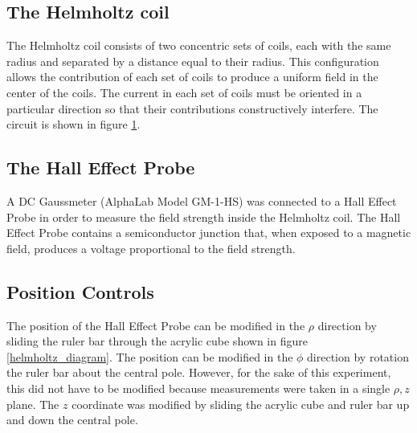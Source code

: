 \documentclass[a4paper]{article}
\begin{document}
\subsection{The Helmholtz coil}
The Helmholtz coil consists of two concentric sets of coils, each with the same radius and separated by a distance equal to their radius. This configuration allows the contribution of each set of coils to produce a uniform field in the center of the coils. The current in each set of coils must be oriented in a particular direction so that their contributions constructively interfere. The circuit is shown in figure \ref{helmholtz_circuit}. 

\begin{figure}[h]
\centering
\label{helmholtz_circuit}
\end{figure}

\subsection{The Hall Effect Probe}
A DC Gaussmeter (AlphaLab Model GM-1-HS) was connected to a Hall Effect Probe in order to measure the field strength inside the Helmholtz coil. The Hall Effect Probe contains a semiconductor junction that, when exposed to a magnetic field, produces a voltage proportional to the field strength.

\subsection{Position Controls}

The position of the Hall Effect Probe can be modified in the $\rho$ direction by sliding the ruler bar through the acrylic cube shown in figure \ref{helmholtz_diagram}. The position can be modified in the $\phi$ direction by rotation the ruler bar about the central pole. However, for the sake of this experiment, this did not have to be modified because measurements were taken in a single $\rho , z$ plane. The $z$ coordinate was modified by sliding the acrylic cube and ruler bar up and down the central pole.
\end{document}

